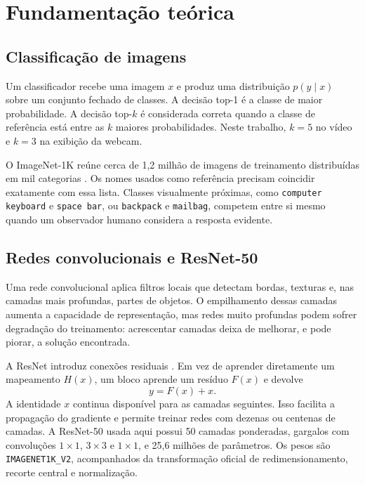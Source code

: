 \documentclass[12pt,a4paper]{article}
\begin{document}
\section{Fundamentação teórica}

\subsection{Classificação de imagens}

Um classificador recebe uma imagem \(x\) e produz uma distribuição
\(p(y \mid x)\) sobre um conjunto fechado de classes. A decisão top-1 é a classe de
maior probabilidade. A decisão top-\(k\) é considerada correta quando a classe de
referência está entre as \(k\) maiores probabilidades. Neste trabalho, \(k = 5\) no
vídeo e \(k = 3\) na exibição da webcam.

O ImageNet-1K reúne cerca de 1,2 milhão de imagens de treinamento distribuídas em mil
categorias \cite{russakovsky2015}. Os nomes usados como referência precisam coincidir
exatamente com essa lista. Classes visualmente próximas, como \texttt{computer keyboard}
e \texttt{space bar}, ou \texttt{backpack} e \texttt{mailbag}, competem entre si mesmo
quando um observador humano considera a resposta evidente.

\subsection{Redes convolucionais e ResNet-50}

Uma rede convolucional aplica filtros locais que detectam bordas, texturas e, nas
camadas mais profundas, partes de objetos. O empilhamento dessas camadas aumenta a
capacidade de representação, mas redes muito profundas podem sofrer degradação do
treinamento: acrescentar camadas deixa de melhorar, e pode piorar, a solução encontrada.

A ResNet introduz conexões residuais \cite{he2016}. Em vez de aprender diretamente um
mapeamento \(H(x)\), um bloco aprende um resíduo \(F(x)\) e devolve
\[
    y = F(x) + x.
\]
A identidade \(x\) continua disponível para as camadas seguintes. Isso facilita a
propagação do gradiente e permite treinar redes com dezenas ou centenas de camadas.
A ResNet-50 usada aqui possui 50 camadas ponderadas, gargalos com convoluções
\(1 \times 1\), \(3 \times 3\) e \(1 \times 1\), e 25,6 milhões de parâmetros.
Os pesos são \texttt{IMAGENET1K\_V2}, acompanhados da transformação oficial de
redimensionamento, recorte central e normalização.
\end{document}
